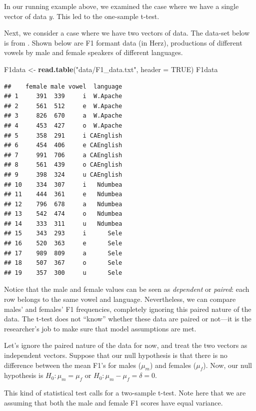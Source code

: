 \documentclass[12pt,]{krantz}
\newenvironment{Shaded}{\begin{snugshade}}{\end{snugshade}}
\newcommand{\DataTypeTok}[1]{\textcolor[rgb]{0.13,0.29,0.53}{#1}}
\newcommand{\KeywordTok}[1]{\textcolor[rgb]{0.13,0.29,0.53}{\textbf{#1}}}
\newcommand{\NormalTok}[1]{#1}
\newcommand{\OtherTok}[1]{\textcolor[rgb]{0.56,0.35,0.01}{#1}}
\newcommand{\StringTok}[1]{\textcolor[rgb]{0.31,0.60,0.02}{#1}}
\begin{document}
In our running example above, we examined the case where we have a single vector of data \(y\). This led to the one-sample t-test.

Next, we consider a case where we have two vectors of data. The data-set below is from \citet{johnson2011quantitative}. Shown below are F1 formant data (in Herz), productions of different vowels by male and female speakers of different languages.

\begin{Shaded}
\begin{Highlighting}[]
\NormalTok{F1data <-}\StringTok{ }\KeywordTok{read.table}\NormalTok{(}\StringTok{"data/F1_data.txt"}\NormalTok{, }
  \DataTypeTok{header =} \OtherTok{TRUE}\NormalTok{)}
\NormalTok{F1data}
\end{Highlighting}
\end{Shaded}

\begin{verbatim}
##    female male vowel  language
## 1     391  339     i  W.Apache
## 2     561  512     e  W.Apache
## 3     826  670     a  W.Apache
## 4     453  427     o  W.Apache
## 5     358  291     i CAEnglish
## 6     454  406     e CAEnglish
## 7     991  706     a CAEnglish
## 8     561  439     o CAEnglish
## 9     398  324     u CAEnglish
## 10    334  307     i   Ndumbea
## 11    444  361     e   Ndumbea
## 12    796  678     a   Ndumbea
## 13    542  474     o   Ndumbea
## 14    333  311     u   Ndumbea
## 15    343  293     i      Sele
## 16    520  363     e      Sele
## 17    989  809     a      Sele
## 18    507  367     o      Sele
## 19    357  300     u      Sele
\end{verbatim}

Notice that the male and female values can be seen as \emph{dependent} or \emph{paired}: each row belongs to the same vowel and language. Nevertheless, we can compare males' and females' F1 frequencies, completely ignoring this paired nature of the data. The t-test does not ``know'' whether these data are paired or not---it is the researcher's job to make sure that model assumptions are met.

Let's ignore the paired nature of the data for now, and treat the two vectors as independent vectors. Suppose that our null hypothesis is that there is no difference between the mean F1's for males (\(\mu_m\)) and females (\(\mu_f\)).
Now, our null hypothesis is \(H_0: \mu_m = \mu_f\) or \(H_0: \mu_m - \mu_f = \delta = 0\).

This kind of statistical test calls for a two-sample t-test. Note here that we are assuming that both the male and female F1 scores have equal variance.
\end{document}
